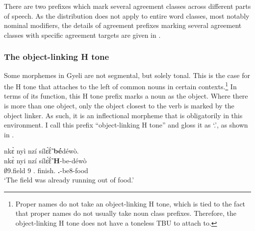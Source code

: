 There are two prefixes which mark several agreement classes across different parts of speech. As the distribution does not apply to entire word classes, most notably nominal modifiers, the details of agreement prefixes marking several agreement classes with specific agreement targets are given in . 

\begin{table}
\caption{Prefixes marking multiple agreement classes}
\label{Tab:AGRmorph}
\end{table}



\subsubsection{The object-linking H tone}
\label{sec:OBJTone}


Some morphemes in Gyeli are not segmental, but solely tonal. This is the case for the H tone that attaches to the left of common nouns in certain contexts.\footnote{Proper names do not take an object-linking H tone, which is tied to the fact that proper names do not usually take noun class prefixes. Therefore, the object-linking H tone does not have a toneless TBU to attach to.} In terms of its function, this H tone prefix marks a noun as the object. Where there is more than one object, only the object closest to the verb is marked by the object linker.  As such, it is an inflectional morpheme that is obligatorily in this environment. I call this prefix ``object-linking H tone'' and gloss it as `{\OBJ}.{\LINK}', as shown in .

\ea \label{OBJ40}
  \glll nkɛ̀ nyì nzí sílɛ̃́ɛ̃̀ {\bfseries bé}déwò. \\
          nkɛ̀ nyi nzí sílɛ̃́ɛ̃̀ {\bfseries H}-be-déwò \\
          $\emptyset$9.field 9 {\PROG}.{\PST} finish.{\COMPL} {\bfseries {\OBJ}.{\LINK}}-be8-food   \\
    \trans `The field was already running out of food.'
\z


